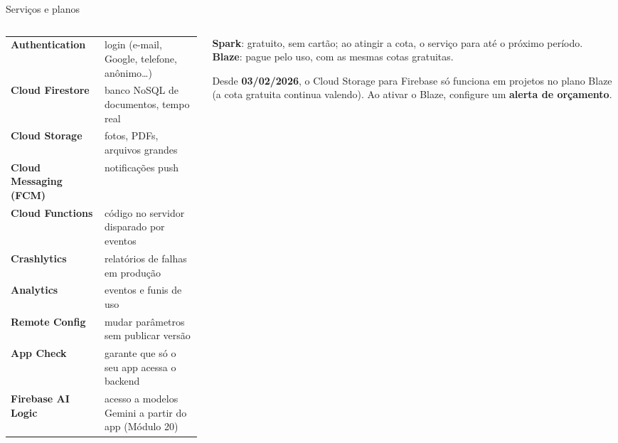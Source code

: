 \documentclass[aspectratio=169,10pt]{beamer}
\begin{document}
\begin{frame}{Serviços e planos}
  \begin{columns}[T]
    \begin{column}{0.56\textwidth}
      \scriptsize
      \begin{tabularx}{\linewidth}{@{}l L@{}}
        \toprule
         &  \\
        \midrule
        \textbf{Authentication} & login (e-mail, Google, telefone, anônimo\ldots) \\
        \textbf{Cloud Firestore} & banco NoSQL de documentos, tempo real \\
        \textbf{Cloud Storage} & fotos, PDFs, arquivos grandes \\
        \textbf{Cloud Messaging (FCM)} & notificações push \\
        \textbf{Cloud Functions} & código no servidor disparado por eventos \\
        \textbf{Crashlytics} & relatórios de falhas em produção \\
        \textbf{Analytics} & eventos e funis de uso \\
        \textbf{Remote Config} & mudar parâmetros sem publicar versão \\
        \textbf{App Check} & garante que só o seu app acessa o backend \\
        \textbf{Firebase AI Logic} & acesso a modelos Gemini a partir do app (Módulo 20) \\
        \bottomrule
      \end{tabularx}
    \end{column}
    \begin{column}{0.42\textwidth}
      \begin{conceito}[Planos]
        \textbf{Spark}: gratuito, sem cartão; ao atingir a cota, o serviço para até o próximo período.\\
        \textbf{Blaze}: pague pelo uso, com as mesmas cotas gratuitas.
      \end{conceito}
      \begin{atencao}
        Desde \textbf{03/02/2026}, o Cloud Storage para Firebase só funciona em projetos no plano Blaze (a cota gratuita continua valendo). Ao ativar o Blaze, configure um \textbf{alerta de orçamento}.
      \end{atencao}
    \end{column}
  \end{columns}
\end{frame}
\end{document}
